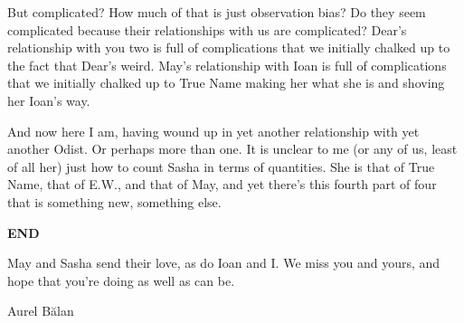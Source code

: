 But complicated? How much of that is just observation bias? Do they seem complicated because their relationships with us are complicated? Dear's relationship with you two is full of complications that we initially chalked up to the fact that Dear's weird. May's relationship with Ioan is full of complications that we initially chalked up to True Name making her what she is and shoving her Ioan's way.

And now here I am, having wound up in yet another relationship with yet another Odist. Or perhaps more than one. It is unclear to me (or any of us, least of all her) just how to count Sasha in terms of quantities. She is that of True Name, that of E.W., and that of May, and yet there's this fourth part of four that is something new, something else.

\textbf{END}

May and Sasha send their love, as do Ioan and I. We miss you and yours, and hope that you're doing as well as can be.

Aurel Bălan
